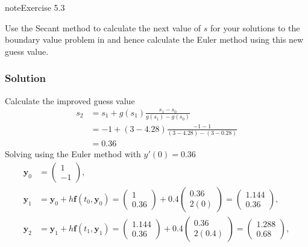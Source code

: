 \documentclass[letterpaper,10pt,english]{jupyterBook}
\begin{document}
\begin{sphinxadmonition}{note}{Exercise 5.3}

\sphinxAtStartPar
Use the Secant method to calculate the next value of \(s\) for your solutions to the boundary value problem in {\hyperref[\detokenize{5_BVPs/5.4_BVP_exercises:ex5-2}]{}} and hence calculate the Euler method using this new guess value.
\subsubsection*{Solution}

\sphinxAtStartPar
Calculate the improved guess value
\begin{align*}
    s_2 &= s_1 + g(s_1) \frac{s_1 - s_0}{g(s_1) - g(s_0)} \\
    &= -1 + (3 - 4.28) \frac{-1 - 1}{(3 - 4.28) - (3 - 0.28)} \\
    &= 0.36
\end{align*}
\sphinxAtStartPar
Solving using the Euler method with \(y'(0) = 0.36\)
\begin{align*}
    \mathbf{y}_0 &= \begin{pmatrix} 1 \\ -1 \end{pmatrix}, \\
    \mathbf{y}_1 &= \mathbf{y}_0 + h \mathbf{f}(t_0, \mathbf{y}_0) 
    = \begin{pmatrix} 1 \\ 0.36 \end{pmatrix} + 0.4 \begin{pmatrix} 0.36 \\ 2(0) \end{pmatrix} 
    = \begin{pmatrix} 1.144 \\ 0.36 \end{pmatrix}, \\
    \mathbf{y}_2 &= \mathbf{y}_1 + h \mathbf{f}(t_1, \mathbf{y}_1) 
    = \begin{pmatrix} 1.144 \\ 0.36 \end{pmatrix} + 0.4 \begin{pmatrix} 0.36 \\ 2(0.4) \end{pmatrix} 
    = \begin{pmatrix} 1.288 \\ 0.68 \end{pmatrix}, \\

\end{align*}
\end{sphinxadmonition}
\end{document}
